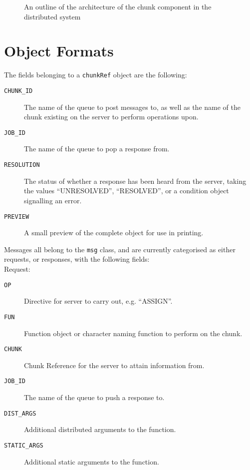 \documentclass[a4paper,10pt]{article}
\begin{document}
\begin{figure}
	\caption{\label{fig:chunk-arch} An outline of the architecture of the
	chunk component in the distributed system}
\end{figure}

\newpage
\section{Object Formats}
The fields belonging to a \texttt{chunkRef} object are the following:
\begin{description}
	\item[\texttt{CHUNK\_ID}] The name of the queue to post messages to, as
		well as the name of the chunk existing on the server to perform
		operations upon.
	\item[\texttt{JOB\_ID}] The name of the queue to pop a response from.
	\item[\texttt{RESOLUTION}] The status of whether a response has been
		heard from the server, taking the values ``UNRESOLVED'',
		``RESOLVED'', or a condition object signalling an error.
	\item[\texttt{PREVIEW}] A small preview of the complete object for use
		in printing.
\end{description}

Messages all belong to the \texttt{msg} class, and are currently categorised as
either requests, or responses, with the following fields:\\

Request:
\begin{description}
	\item[\texttt{OP}] Directive for server to carry out, e.g. ``ASSIGN''.
	\item[\texttt{FUN}] Function object or character naming function to
		perform on the chunk.
	\item[\texttt{CHUNK}] Chunk Reference for the server to attain
		information from.
	\item[\texttt{JOB\_ID}] The name of the queue to push a response to.
	\item[\texttt{DIST\_ARGS}] Additional distributed arguments to the
		function.
	\item[\texttt{STATIC\_ARGS}] Additional static arguments to the
		function.
\end{description}
\end{document}
